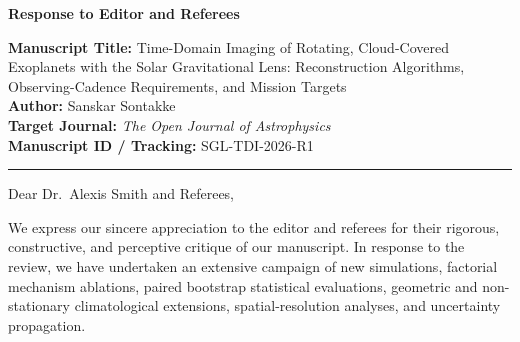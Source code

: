 \documentclass[11pt]{article}
\begin{document}
{\LARGE\bfseries Response to Editor and Referees\par}
\vspace{2mm}
\textbf{Manuscript Title:} Time-Domain Imaging of Rotating, Cloud-Covered Exoplanets with the Solar Gravitational Lens: Reconstruction Algorithms, Observing-Cadence Requirements, and Mission Targets\\[1mm]
\textbf{Author:} Sanskar Sontakke\\
\textbf{Target Journal:} \textit{The Open Journal of Astrophysics}\\
\textbf{Manuscript ID / Tracking:} SGL-TDI-2026-R1\\[2mm]
\hrule
\vspace{4mm}

Dear Dr.\ Alexis Smith and Referees,

We express our sincere appreciation to the editor and referees for their rigorous, constructive, and perceptive critique of our manuscript. In response to the review, we have undertaken an extensive campaign of new simulations, factorial mechanism ablations, paired bootstrap statistical evaluations, geometric and non-stationary climatological extensions, spatial-resolution analyses, and uncertainty propagation.
\end{document}
